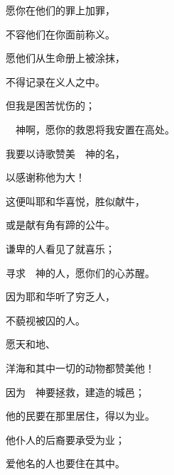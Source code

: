 {\par }{\Q {}愿你在他们的罪上加罪，
\par }{\Q 不容他们在你面前称义。
\par }{\Q {}愿他们从生命册上被涂抹，
\par }{\Q 不得记录在义人之中。
\par }{\Q {}但我是困苦忧伤的；
\par }{\Q 　神啊，愿你的救恩将我安置在高处。
\par }{\BB \par }{\Q {}我要以诗歌赞美　神的名，
\par }{\Q 以感谢称他为大！
\par }{\Q {}这便叫耶和华喜悦，胜似献牛，
\par }{\Q 或是献有角有蹄的公牛。
\par }{\Q {}谦卑的人看见了就喜乐；
\par }{\Q 寻求　神的人，愿你们的心苏醒。
\par }{\Q {}因为耶和华听了穷乏人，
\par }{\Q 不藐视被囚的人。
\par }{\BB \par }{\Q {}愿天和地、
\par }{\Q 洋海和其中一切的动物都赞美他！
\par }{\Q {}因为　神要拯救{}，建造{}的城邑；
\par }{\Q 他的民要在那里居住，得以为业。
\par }{\Q {}他仆人的后裔要承受为业；
\par }{\Q 爱他名的人也要住在其中。

\par }
